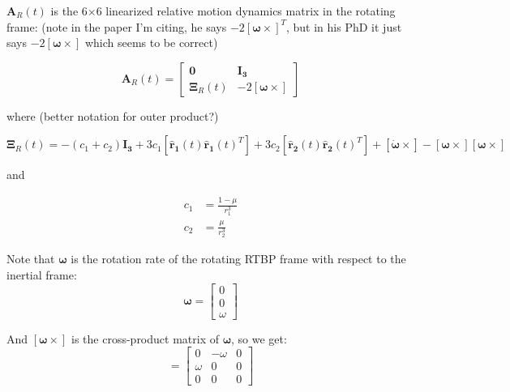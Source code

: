 \documentclass[]{article}
\begin{document}
\(\mathbf{A}_R(t)\) is the 6\(\times\)6 linearized relative motion dynamics matrix in the rotating frame: (note in the paper I'm citing, he says \(-2 [\boldsymbol{\omega} \times]^T\), but in his PhD it just says \(-2 [\boldsymbol{\omega} \times]\) which seems to be correct)

\begin{equation} \label{eq:RelmoDynMatrix}
\mathbf{A}_R(t) = \begin{bmatrix}
								\mathbf{0}          & \mathbf{I_3} \\
								\mathbf{\Xi}_R(t) & -2 [\boldsymbol{\omega} \times]
								\end{bmatrix}
\end{equation}

where  (better notation for outer product?)

\begin{equation*}
\mathbf{\Xi}_R(t) = -(c_1 + c_2)\mathbf{I_3} 
								+ 3c_1[\mathbf{\hat{r}_1}(t) \mathbf{\hat{r}_1}(t)^T] 
								+ 3c_2[\mathbf{\hat{r}_2}(t) \mathbf{\hat{r}_2}(t)^T] 
								+ [\boldsymbol{\dot{\omega}} \times] 
								- [\boldsymbol{\omega}\times][\boldsymbol{\omega}\times]
\end{equation*}

and

\begin{equation*}
\begin{aligned}
c_1 &= \frac{1- \mu}{r_1^3} \\
c_2 &= \frac{\mu}{r_2^3}
\end{aligned}
\end{equation*}

Note that \(\boldsymbol{\omega}\) is the rotation rate of the rotating RTBP frame with respect to the inertial frame:
\begin{equation*}
\boldsymbol{\omega} = \begin{bmatrix}
					0 \\ 
					0 \\
					\omega
					\end{bmatrix}
\end{equation*}

And  \([\boldsymbol{\omega}\times]\) is the cross-product matrix of \(\boldsymbol{\omega}\), so we get:
\begin{equation*}
[\boldsymbol{\omega}\times] = \begin{bmatrix}
								0           & -\omega & 0 \\ 
								\omega & 0             & 0 \\
								0           & 0             & 0
								\end{bmatrix}
\end{equation*}
\end{document}
